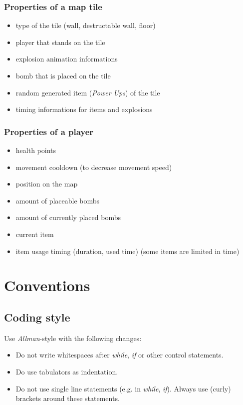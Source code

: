 \documentclass{article}
\begin{document}
			\subsubsection{Properties of a map tile}
				\begin{itemize}
					\item type of the tile (wall, destructable wall, floor)
					\item player that stands on the tile
					\item explosion animation informations
					\item bomb that is placed on the tile
					\item random generated item (\emph{Power Ups}) of the tile
					\item timing informations for items and explosions
				\end{itemize}
			
			\subsubsection{Properties of a player}
				\begin{itemize}
					\item health points
					\item movement cooldown (to decrease movement speed)
					\item position on the map
					\item amount of placeable bombs
					\item amount of currently placed bombs
					\item current item
					\item item usage timing (duration, used time) (some items are limited in time)
				\end{itemize}
	
	\section{Conventions}
		\subsection{Coding style}
			Use \emph{Allman}-style with the following changes:
			\begin{itemize}
				\item Do not write whitespaces after \emph{while}, \emph{if} or other control statements.
				\item Do use tabulators as indentation.
				\item Do not use single line statements (e.g. in \emph{while}, \emph{if}). Always use (curly) brackets around these statements.
			\end{itemize}
		
\end{document}
